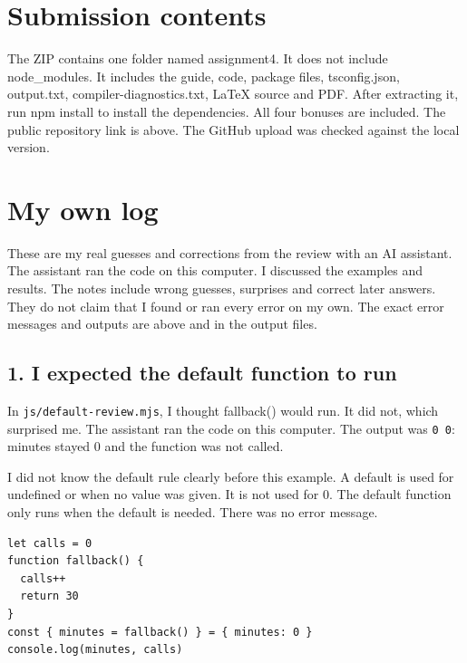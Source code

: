 \documentclass[
  10pt,
  a4paper,
]{article}
\begin{document}
\section{Submission contents}\label{submission-contents}

The ZIP contains one folder named assignment4. It does not include
node\_modules. It includes the guide, code, package files,
tsconfig.json, output.txt, compiler-diagnostics.txt, LaTeX source and
PDF. After extracting it, run npm install to install the dependencies.
All four bonuses are included. The public repository link is above. The
GitHub upload was checked against the local version.

\section{My own log}\label{my-own-log}

These are my real guesses and corrections from the review with an AI
assistant. The assistant ran the code on this computer. I discussed the
examples and results. The notes include wrong guesses, surprises and
correct later answers. They do not claim that I found or ran every error
on my own. The exact error messages and outputs are above and in the
output files.

\subsection{1. I expected the default function to
run}\label{i-expected-the-default-function-to-run}

In \texttt{js/\allowbreak{}default-review.\allowbreak{}mjs}, I thought
fallback() would run. It did not, which surprised me. The assistant ran
the code on this computer. The output was \texttt{0 0}: minutes stayed 0
and the function was not called.

I did not know the default rule clearly before this example. A default
is used for undefined or when no value was given. It is not used for 0.
The default function only runs when the default is needed. There was no
error message.

\begin{minipage}{\linewidth}

\begin{lstlisting}
let calls = 0
function fallback() {
  calls++
  return 30
}
const { minutes = fallback() } = { minutes: 0 }
console.log(minutes, calls)
\end{lstlisting}

\end{minipage}\par
\end{document}
